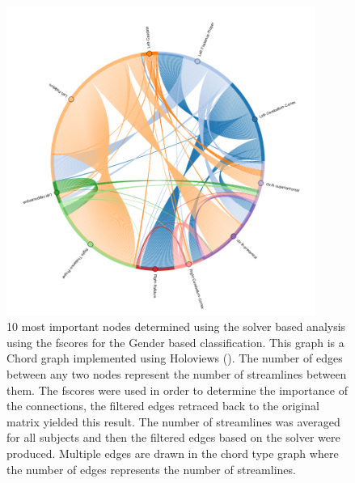 \documentclass[msthesis.tex]{subfiles}
\begin{document}

\begin{figure}
    \centering
    \includegraphics[width=0.9\textwidth]{images/gender10nodes_numstrls.png}
    \caption{10 most important nodes determined using the solver based analysis using the fscores for the Gender based classification. This graph is a Chord graph implemented using Holoviews (\cite{stevens2015holoviews}). The number of edges between any two nodes represent the number of streamlines between them. The fscores were used in order to determine the importance of the connections, the filtered edges retraced back to the original matrix yielded this result. The number of streamlines was averaged for all subjects and then the filtered edges based on the solver were produced. Multiple edges are drawn in the chord type graph where the number of edges represents the number of streamlines.}
    \label{fig:gender_num_strls_10}
\end{figure}
\end{document}
